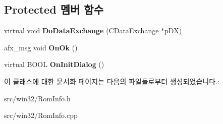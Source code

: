 \subsection*{Protected 멤버 함수}
\begin{DoxyCompactItemize}
\item 
\mbox{\label{class_rom_info_g_b_a_a19a2f111cce09e494d2877767ad615dd}} 
virtual void {\bfseries Do\+Data\+Exchange} (C\+Data\+Exchange $\ast$p\+DX)
\item 
\mbox{\label{class_rom_info_g_b_a_ad01e4389fa3c966b785976bbcb2a430b}} 
afx\+\_\+msg void {\bfseries On\+Ok} ()
\item 
\mbox{\label{class_rom_info_g_b_a_aa449f0a97d7515dd30ef8b5dabb343a3}} 
virtual B\+O\+OL {\bfseries On\+Init\+Dialog} ()
\end{DoxyCompactItemize}


이 클래스에 대한 문서화 페이지는 다음의 파일들로부터 생성되었습니다.\+:\begin{DoxyCompactItemize}
\item 
src/win32/Rom\+Info.\+h\item 
src/win32/Rom\+Info.\+cpp\end{DoxyCompactItemize}

